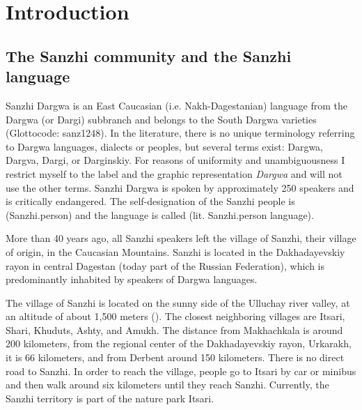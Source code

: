 
\chapter{Introduction}
\label{cpt:Introduction}


\section{The Sanzhi community and the Sanzhi language}
\label{sec:The Sanzhi community and the Sanzhi language}

Sanzhi Dargwa is an East Caucasian (i.e. Nakh-Dagestanian) language from the Dargwa (or Dargi) subbranch and belongs to the South Dargwa varieties (Glottocode: sanz1248). In the literature, there is no unique terminology referring to Dargwa languages, dialects or peoples, but several terms exist: Dargwa, Dargva, Dargi, or Darginskiy. For reasons of uniformity and unambiguousness I restrict myself to the label and the graphic representation \textit{Dargwa} and will not use the other terms. Sanzhi Dargwa is spoken by approximately 250 speakers and is critically endangered. The self-designation of the Sanzhi people is  (Sanzhi.person) and the language is called  (lit. Sanzhi.person language).

More than 40 years ago, all Sanzhi speakers left the village of Sanzhi, their village of origin, in the Caucasian Mountains. Sanzhi is located in the Dakhadayevskiy rayon in central Dagestan (today part of the Russian Federation), which is predominantly inhabited by speakers of Dargwa languages.

The village of Sanzhi is located on the sunny side of the Ulluchay river valley, at an altitude of about 1,500 meters (). The closest neighboring villages are Itsari, Shari, Khuduts, Ashty, and Amukh. The distance from Makhachkala is around 200 kilometers, from the regional center of the Dakhadayevskiy rayon, Urkarakh, it is 66 kilometers, and from Derbent around 150 kilometers. There is no direct road to Sanzhi. In order to reach the village, people go to Itsari by car or minibus and then walk around six kilometers until they reach Sanzhi. Currently, the Sanzhi territory is part of the nature park Itsari.

